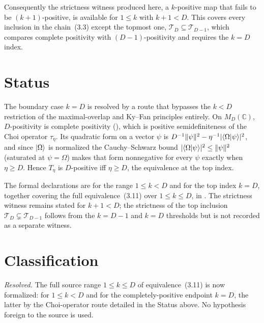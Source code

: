 \documentclass{article}
\begin{document}
Consequently the strictness witness produced here, a $k$-positive map that fails
to be $(k+1)$-positive, is available for $1\le k$ with $k+1<D$.  This covers
every inclusion in the chain~(3.3) except the topmost one,
$\mathcal T_D\subseteq\mathcal T_{D-1}$, which compares complete positivity with
$(D-1)$-positivity and requires the $k=D$ index.

\section{Status}

The boundary case $k=D$ is resolved by a route that bypasses the $k<D$
restriction of the maximal-overlap and Ky--Fan principles entirely.  On
$M_D(\mathbb C)$, $D$-positivity is complete positivity
(), which is positive semidefiniteness of
the Choi operator $\tau_\eta$.  Its quadratic form on a vector $\psi$ is
$D^{-1}\|\psi\|^2-\eta^{-1}|\langle \Omega | \psi \rangle|^2$, and since $|\Omega\rangle$ is
normalized the Cauchy--Schwarz bound $|\langle \Omega | \psi \rangle|^2\le\|\psi\|^2$
(saturated at $\psi=\Omega$) makes that form nonnegative for every $\psi$ exactly
when $\eta\ge D$.  Hence $T_\eta$ is $D$-positive iff $\eta\ge D$, the equivalence
at the top index.

The formal declarations are  for the
range $1\le k<D$ and  for the top
index $k=D$, together covering the full equivalence~(3.11) over $1\le k\le D$, in
.  The strictness witness
 remains stated for $k+1<D$; the
strictness of the top inclusion $\mathcal T_D\subsetneq\mathcal T_{D-1}$ follows
from the $k=D-1$ and $k=D$ thresholds but is not recorded as a separate witness.

\section{Classification}

\emph{Resolved.} The full source range $1\le k\le D$ of equivalence~(3.11) is now
formalized:  for $1\le k<D$ and
 for the completely-positive endpoint
$k=D$, the latter by the Choi-operator route detailed in the Status above.  No
hypothesis foreign to the source is used.



\end{document}
